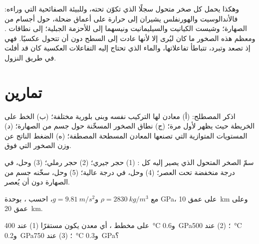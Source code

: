 وهكذا يحمل كل صخر متحول سجلًا  الذي
تكوّن تحته، وللبيئة الصفائحية التي وراءه: فالأندالوسيت والهورنفلس يشيران إلى
حرارة على أعماق ضحلة، حول أجسام من الصهارة؛ وشيست الكيانيت والسيليمانيت
ونيسهما إلى  للأحزمة الجبلية؛ 
 إلى نطاقات . ومعظم هذه الصخور ما كان ليُرى إلا
لأنها عادت إلى السطح دون أن تتحول عكسيًا. فهي إذ تصعد
وتبرد، تتباطأ تفاعلاتها، والماء الذي تحتاج إليه التفاعلات
العكسية كان قد أفلت في طريق النزول.

\section{تمارين}

\begin{exercise}[$\star$]\label{exo:g12:metamorphic-rocks:1}
اذكر المصطلح: (أ) معادن لها التركيب نفسه وبنى بلورية
مختلفة؛ (ب) الخط على الخريطة حيث يظهر  لأول مرة؛
(ج) نطاق الصخور المسخّنة حول جسم من الصهارة؛ (د) المستويات المتوازية
التي تصنعها المعادن المسطحة المصطفة؛ (ه) الضغط الناتج عن وزن
الصخور التي فوق.
\end{exercise}

\begin{exercise}[$\star$]\label{exo:g12:metamorphic-rocks:2}
سمّ الصخر المتحول الذي يصير إليه كل : (1) حجر جيري؛
(2) حجر رملي؛ (3) وحل، في درجة منخفضة تحت العصر؛ (4) وحل، في درجة
عالية؛ (5) وحل، سخّنه جسم من الصهارة دون أن يُعصر.
\end{exercise}

\begin{exercise}[$\star$]\label{exo:g12:metamorphic-rocks:3}
مع $\rho = \qty{2830}{kg/m^3}$ و$g = \qty{9.81}{m/s^2}$، احسب
، بوحدة \unit{GPa}، على عمق \qty{10}{km} وعلى عمق \qty{20}{km}.
\end{exercise}

\begin{exercise}[$\star$]\label{exo:g12:metamorphic-rocks:4}
على مخطط  ، أي معدن يكون مستقرًا
(1) عند \qty{400}{\celsius} و\qty{0.6}{GPa}؛ (2) عند \qty{500}{\celsius}
و\qty{0.2}{GPa}؛ (3) عند \qty{750}{\celsius} و\qty{0.3}{GPa}؟
\end{exercise}

